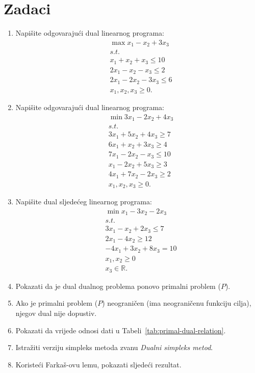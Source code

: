 \documentclass[a4paper, utf8, 11pt, colorlinks]{book}
\begin{document}
\section{Zadaci}
\begin{enumerate}
	\item %
	Napišite odgovarajući dual linearnog programa:
	\begin{align*}
		 &\max x_1 - x_2 + 3 x_3 \\
		 & s.t. \\
		 & x_1 + x_2 + x_3 \leq 10 \\
		 & 2x_1 - x_2 - x_3 \leq 2 \\
		 & 2x_1 - 2x_2 - 3 x_3 \leq 6 \\
		 & x_1, x_2, x_3 \geq 0.
	\end{align*}
 \item    	Napišite odgovarajući dual linearnog programa:
      \begin{align*}
      	  &\min 3 x_1 - 2 x_2 + 4 x_3 \\
      	  & s.t. \\
      	  & 3x_1 + 5 x_2 + 4 x_3 \geq 7 \\
      	  & 6 x_1 + x_2 + 3 x_3 \geq 4 \\
      	  & 7 x_1 - 2 x_2 - x_3 \leq 10 \\
      	  & x_1 - 2 x_2 + 5 x_3 \geq 3 \\
      	  & 4 x_1 + 7 x_2 - 2 x_3 \geq 2 \\
      	  & x_1, x_2, x_3 \geq 0.
      \end{align*}
  \item Napišite dual sljedećeg linearnog programa:
  \begin{align*}
        &\min x_1 - 3 x_2 - 2 x_3 \\
        & s.t. \\
        & 3 x_1 - x_2 + 2 x_3 \leq 7 \\
        & 2 x_1 - 4 x_2 \geq 12 \\
        & -4x_1 + 3x_2 + 8 x_3 = 10 \\
        & x_1, x_2\geq 0 \\
        & x_3 \in \mathbb{R}. 
  \end{align*}
\item %
Pokazati da je dual dualnog problema ponovo primalni problem ($P$).
\item Ako je primalni problem ($P$) neograničen (ima neograničenu funkciju cilja), njegov dual nije dopustiv.
\item Pokazati da vrijede odnosi dati u Tabeli~\ref{tab:primal-dual-relation}.
\item Istražiti verziju simpleks metoda zvanu \emph{Dualni simpleks metod}.
\item Koristeći Farkaš-ovu lemu, pokazati sljedeći rezultat. 
 

\end{enumerate}
\end{document}
